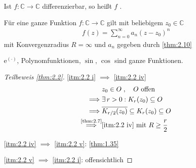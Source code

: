 \begin{theorem}[Definition] \label{thm:2.11}
  Ist $f:\mathbb{C} \to \mathbb{C}$ differenzierbar, so heißt $f$ . 
\end{theorem}
  
\begin{notice*}
  Für eine ganze Funktion $f: \mathbb{C} \to \mathbb{C}$ gilt mit beliebigem $z_0 \in \mathbb{C}$
  \begin{align*}
    f(z) = \sum\limits_{n=0}^{\infty} a_n (z-z_0)^n
  \end{align*}
  mit Konvergenzradius $R = \infty$ und $a_n$ gegeben durch \ref{thm:2.10}
\end{notice*}

\begin{example}
  $\mathrm{e}^{(\cdot)}$, Polynomfunktionen, $\sin$, $\cos$ sind ganze Funktionen.
\end{example}

\begin{proof}[Teilbeweis \ref{thm:2.2}]
  \ref{itm:2.2 i} $\implies$ \ref{itm:2.2 iv}
  \begin{align*}
    & z_0 \in O \; , \quad O \text{ offen} \\
    \implies& \exists \, r > 0 : K_r(z_0) \subseteq O \\
    \implies& \overline{K_{r/2}(z_0)} \subseteq K_r(z_0) \subseteq O \\
    \overset{\text{\ref{thm:2.7}}}{\implies}& \text{\ref{itm:2.2 iv}} \text{ mit } R \geq \frac{r}{2}
  \end{align*}
  
  \ref{itm:2.2 iv} $\implies$ \ref{itm:2.2 v}: \ref{thm:1.35}
  
  \ref{itm:2.2 v} $\implies$ \ref{itm:2.2 i}: offensichtlich
\end{proof}

